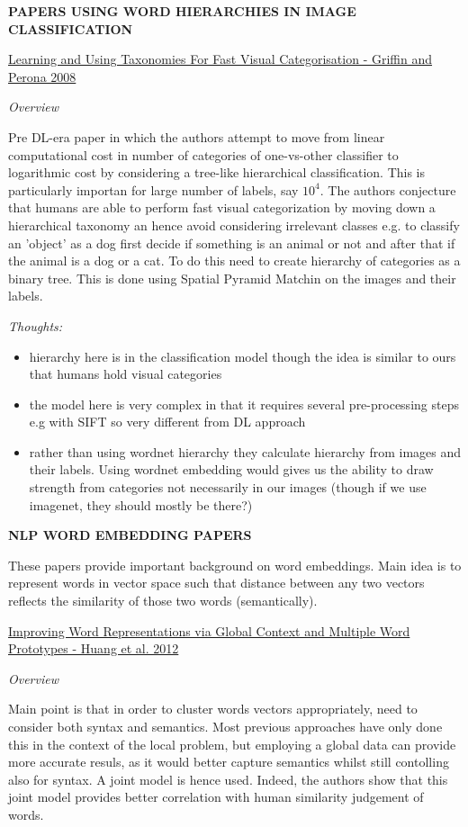 \documentclass{report}
\begin{document}
\newpage

\textbf{PAPERS USING WORD HIERARCHIES IN IMAGE CLASSIFICATION}

\underline{Learning and Using Taxonomies For Fast Visual Categorisation - Griffin and Perona 2008}

\textit{Overview}

Pre DL-era paper in which the authors attempt to move from linear computational cost in number of categories of one-vs-other classifier to logarithmic cost by considering a tree-like hierarchical classification. This is particularly importan for large number of labels, say $10^4$. The authors conjecture that humans are able to perform fast visual categorization by moving down a hierarchical taxonomy an hence avoid considering irrelevant classes e.g. to classify an 'object' as a dog first decide if something is an animal or not and after that if the animal is a dog or a cat. To do this need to create hierarchy of categories as a binary tree. This is done using Spatial Pyramid Matchin on the images and their labels.  

\textit{Thoughts:}
\begin{itemize}
    \item hierarchy here is in the classification model though the idea is similar to ours that humans hold visual categories
    \item the model here is very complex in that it requires several pre-processing steps e.g with SIFT so very different from DL approach
    \item rather than using wordnet hierarchy they calculate hierarchy from images and their labels. Using wordnet embedding would gives us the ability to draw strength from categories not necessarily in our images (though if we use imagenet, they should mostly be there?)
  \end{itemize}



\newpage

\textbf{NLP WORD EMBEDDING PAPERS}

These papers provide important background on word embeddings. Main idea is to represent words in vector space such that distance between any two vectors reflects the similarity of those two words (semantically). 

\underline{Improving Word Representations via Global Context and Multiple Word Prototypes - Huang et al. 2012}

\textit{Overview}

Main point is that in order to cluster words vectors appropriately, need to consider both syntax and semantics. Most previous approaches have only done this in the context of the local problem, but employing a global data can provide more accurate resuls, as it would better capture semantics whilst still contolling also for syntax. A joint model is hence used. Indeed, the authors show that this joint model provides better correlation with human similarity judgement of words.
\end{document}
